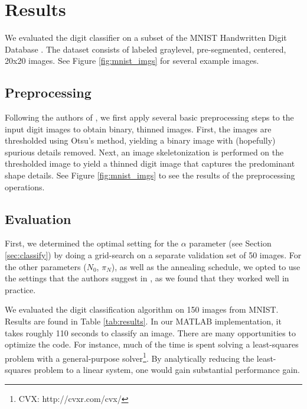 \documentclass[oribibl]{llncs}
\begin{document}
\section{Results}

We evaluated the digit classifier on a subset of the MNIST Handwritten Digit Database \cite{mnist}.
The dataset consists of labeled graylevel, pre-segmented, centered, 20x20 images.
See Figure \ref{fig:mnist_imgs} for several example images.

\subsection{Preprocessing}
\label{sec:preproc}

Following the authors of \cite{Hinton92adaptiveelastic}, we first apply several basic preprocessing steps to the input digit images to obtain binary, thinned images.
First, the images are thresholded using Otsu's method, yielding a binary image with (hopefully) spurious details removed.
Next, an image skeletonization is performed on the thresholded image to yield a thinned digit image that captures the predominant shape details.
See Figure \ref{fig:mnist_imgs} to see the results of the preprocessing operations.

\subsection{Evaluation}

First, we determined the optimal setting for the $\alpha$ parameter (see Section \ref{sec:classify}) by doing a grid-search on a separate validation set of 50 images.
For the other parameters ($N_0$, $\pi_N$), as well as the annealing schedule, we opted to use the settings that the authors suggest in \cite{Hinton92adaptiveelastic}, as we found that they worked well in practice.

We evaluated the digit classification algorithm on 150 images from MNIST.
Results are found in Table \ref{tab:results}.
In our MATLAB implementation, it takes roughly 110 seconds to classify an image.
There are many opportunities to optimize the code.
For instance, much of the time is spent solving a least-squares problem with a general-purpose solver\footnote{CVX: http://cvxr.com/cvx/}.
By analytically reducing the least-squares problem to a linear system, one would gain substantial performance gain.
\end{document}

